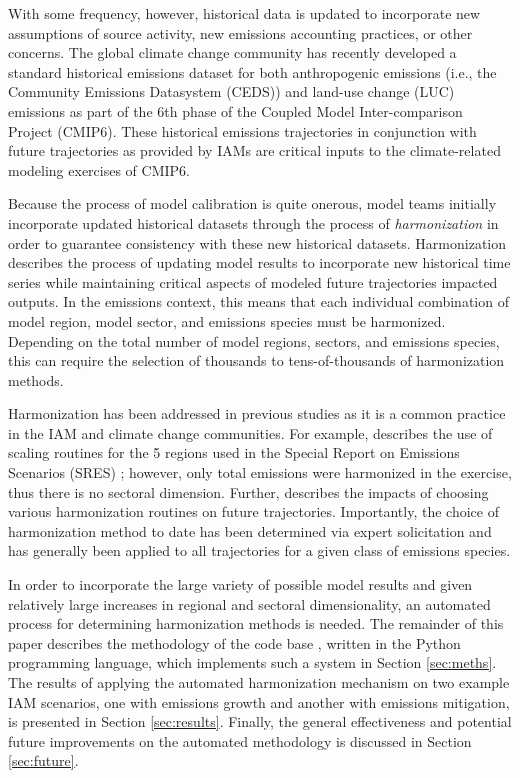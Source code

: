 With some frequency, however, historical data is updated to incorporate new
assumptions of source activity, new emissions accounting practices, or other
concerns. The global climate change community has recently developed a standard
historical emissions dataset for both anthropogenic emissions (i.e., the
Community Emissions Datasystem (CEDS)) \cite{hoesly_historical_2017} and
land-use change (LUC) emissions \cite{van_marle_historic_2017} as part of the
6th phase of the Coupled Model Inter-comparison Project (CMIP6). These
historical emissions trajectories in conjunction with future trajectories as
provided by IAMs are critical inputs to the climate-related modeling exercises
of CMIP6.

Because the process of model calibration is quite onerous, model teams initially
incorporate updated historical datasets through the process of
\textit{harmonization} in order to guarantee consistency with these new
historical datasets. Harmonization describes the process of updating model
results to incorporate new historical time series while maintaining critical
aspects of modeled future trajectories impacted outputs. In the emissions
context, this means that each individual combination of model region, model
sector, and emissions species must be harmonized. Depending on the total number
of model regions, sectors, and emissions species, this can require the selection
of thousands to tens-of-thousands of harmonization methods.

Harmonization has been addressed in previous studies as it is a common practice
in the IAM and climate change communities. For example,
\cite{meinshausen_rcp_2011} describes the use of scaling routines for the 5
regions used in the Special Report on Emissions Scenarios (SRES)
\cite{nakicenovic2000}; however, only total emissions were harmonized in the
exercise, thus there is no sectoral dimension. Further,
\cite{rogelj_discrepancies_2011} describes the impacts of choosing various
harmonization routines on future trajectories. Importantly, the choice of
harmonization method to date has been determined via expert solicitation and has
generally been applied to all trajectories for a given class of emissions
species.

In order to incorporate the large variety of possible model results and given
relatively large increases in regional and sectoral dimensionality, an automated
process for determining harmonization methods is needed. The remainder of this
paper describes the methodology of the  code base ,
written in the Python programming language, which implements such a system in
Section \ref{sec:meths}. The results of applying the automated harmonization
mechanism on two example IAM scenarios, one with emissions growth and another
with emissions mitigation, is presented in Section \ref{sec:results}. Finally,
the general effectiveness and potential future improvements on the automated
methodology is discussed in Section \ref{sec:future}.

